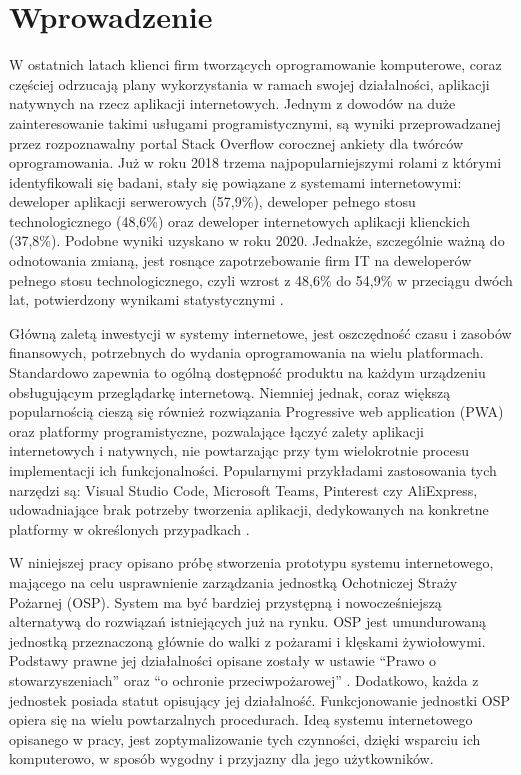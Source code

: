 \section{Wprowadzenie} 

W ostatnich latach klienci firm tworzących oprogramowanie komputerowe, coraz częściej odrzucają plany wykorzystania w ramach swojej działalności, aplikacji natywnych na rzecz aplikacji internetowych. Jednym z dowodów na duże zainteresowanie takimi usługami programistycznymi, są wyniki przeprowadzanej przez rozpoznawalny portal Stack Overflow corocznej ankiety dla twórców oprogramowania. Już w roku 2018 trzema najpopularniejszymi rolami z którymi identyfikowali się badani, stały się powiązane z systemami internetowymi: deweloper aplikacji serwerowych (57,9\%), deweloper pełnego stosu technologicznego (48,6\%) oraz deweloper internetowych aplikacji klienckich (37,8\%). Podobne wyniki uzyskano w roku 2020. Jednakże, szczególnie ważną do odnotowania zmianą, jest rosnące zapotrzebowanie firm IT na deweloperów pełnego stosu technologicznego, czyli wzrost z 48,6\% do 54,9\% w przeciągu dwóch lat, potwierdzony wynikami statystycznymi \cite{StackOverflow.survey}.

Główną zaletą inwestycji w systemy internetowe, jest oszczędność czasu i zasobów finansowych, potrzebnych do wydania oprogramowania na wielu platformach. Standardowo zapewnia to ogólną dostępność produktu na każdym urządzeniu obsługującym przeglądarkę internetową. Niemniej jednak, coraz większą popularnością cieszą się również rozwiązania Progressive web application (PWA) oraz platformy programistyczne, pozwalające łączyć zalety aplikacji internetowych i natywnych, nie powtarzając przy tym wielokrotnie procesu implementacji ich funkcjonalności. Popularnymi przykładami zastosowania tych narzędzi są: Visual Studio Code, Microsoft Teams, Pinterest czy AliExpress, udowadniające brak potrzeby tworzenia aplikacji, dedykowanych na konkretne platformy w określonych przypadkach \cite{Sanderson.PWA-and-containers} \cite{Appmaker.PWA-examples}.

W niniejszej pracy opisano próbę stworzenia prototypu systemu internetowego, mającego na celu usprawnienie zarządzania jednostką Ochotniczej Straży Pożarnej (OSP). System ma być bardziej przystępną i nowocześniejszą alternatywą do rozwiązań istniejących już na rynku. OSP jest umundurowaną jednostką przeznaczoną głównie do walki z pożarami i klęskami żywiołowymi. Podstawy prawne jej działalności opisane zostały w ustawie “Prawo o stowarzyszeniach” \cite{Ustawa.prawo-o-stowarzyszeniach} oraz “o ochronie przeciwpożarowej” \cite{Ustawa.o-ochronie-przeciwpozarowej}. Dodatkowo, każda z jednostek posiada statut opisujący jej działalność. Funkcjonowanie jednostki OSP opiera się na wielu powtarzalnych procedurach. Ideą systemu internetowego opisanego w pracy, jest zoptymalizowanie tych czynności, dzięki wsparciu ich komputerowo, w sposób wygodny i przyjazny dla jego użytkowników.

